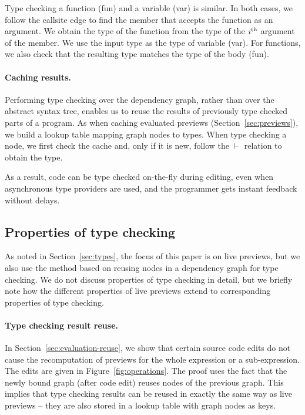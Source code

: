 \documentclass[acmsmall,anonymous,fleqn]{acmart}\settopmatter{printfolios=false,printccs=false,printacmref=false}
\theoremstyle{plain}
\theoremstyle{definition}
\newcommand{\blbl}[1]{\textnormal{\textcolor{numclr}{\sffamily #1}}}
\newcommand{\rname}[1]{{\sffamily\small(#1)}}
\begin{document}
Type checking a function \rname{fun} and a variable \rname{var} is similar. In both cases,
we follow the \blbl{callsite} edge to find the member that accepts the function as an argument.
We obtain the type of the function from the type of the $i^\textnormal{th}$ argument of the
member. We use the input type as the type of variable \rname{var}. For functions, we also check
that the resulting type matches the type of the body \rname{fun}.

\paragraph{Caching results.}
Performing type checking over the dependency graph, rather than over the abstract syntax tree,
enables us to reuse the results of previously type checked parts of a program. As when
caching evaluated previews (Section~\ref{sec:previews}), we build a lookup table mapping graph
nodes to types. When type checking a node, we first check the cache and, only if it is new,
follow the $\vdash$ relation to obtain the type.

As a result, code can be type checked on-the-fly during editing, even when asynchronous type
providers are used, and the programmer gets instant feedback without delays.


\subsection{Properties of type checking}

As noted in Section~\ref{sec:types}, the focus of this paper is on live previews, but we also
use the method based on reusing nodes in a dependency graph for type checking. We do not discuss
properties of type checking in detail, but we briefly note how the different properties of
live previews extend to corresponding properties of type checking.

\paragraph{Type checking result reuse.} In Section~\ref{sec:evaluation-reuse}, we show that
certain source code edits do not cause the recomputation of previews for the whole expression
or a sub-expression. The edits are given in Figure~\ref{fig:operations}. The proof uses the fact
that the newly bound graph (after code edit) reuses nodes of the previous graph. This implies that
type checking results can be reused in exactly the same way as live previews -- they are also
stored in a lookup table with graph nodes as keys.
\end{document}
